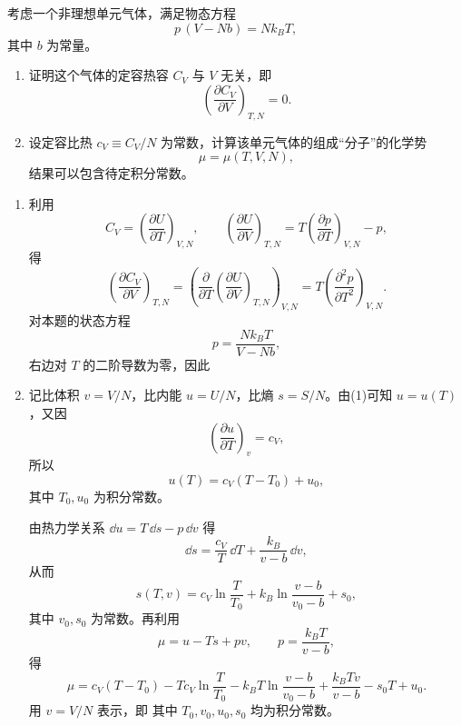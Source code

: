 ﻿


\begin{question}
考虑一个非理想单元气体，满足物态方程
\[
p\,(V-Nb)=Nk_B T,
\]
其中 $b$ 为常量。

\begin{enumerate}[label=(\arabic*),leftmargin=2.5em]
  \item 证明这个气体的定容热容 $C_V$ 与 $V$ 无关，即
  \[
  \left(\frac{\partial C_V}{\partial V}\right)_{T,N}=0.
  \]
  \item 设定容比热 $c_V\equiv C_V/N$ 为常数，计算该单元气体的组成“分子”的化学势
  \[
  \mu=\mu(T,V,N),
  \]
  结果可以包含待定积分常数。
\end{enumerate}

\begin{solution}
\begin{enumerate}[label=(\arabic*),leftmargin=2.5em]
  \item 利用
  \[
  C_V=\left(\frac{\partial U}{\partial T}\right)_{V,N},
  \qquad
  \left(\frac{\partial U}{\partial V}\right)_{T,N}
  =T\left(\frac{\partial p}{\partial T}\right)_{V,N}-p,
  \]
  得
  \[
  \left(\frac{\partial C_V}{\partial V}\right)_{T,N}
  =\left(\frac{\partial}{\partial T}\left(\frac{\partial U}{\partial V}\right)_{T,N}\right)_{V,N}
  =T\left(\frac{\partial^2 p}{\partial T^2}\right)_{V,N}.
  \]
  对本题的状态方程
  \[
  p=\frac{Nk_B T}{V-Nb},
  \]
  右边对 $T$ 的二阶导数为零，因此

  \item 记比体积 $v=V/N$，比内能 $u=U/N$，比熵 $s=S/N$。由(1)可知 $u=u(T)$，又因
  \[
  \left(\frac{\partial u}{\partial T}\right)_v=c_V,
  \]
  所以
  \[
  u(T)=c_V(T-T_0)+u_0,
  \]
  其中 $T_0,u_0$ 为积分常数。

  由热力学关系 $\dd{u}=T\,\dd{s}-p\,\dd{v}$ 得
  \[
  \dd{s}=\frac{c_V}{T}\,\dd{T}+\frac{k_B}{v-b}\,\dd{v},
  \]
  从而
  \[
  s(T,v)=c_V\ln\frac{T}{T_0}+k_B\ln\frac{v-b}{v_0-b}+s_0,
  \]
  其中 $v_0,s_0$ 为常数。再利用
  \[
  \mu=u-Ts+pv,
  \qquad p=\frac{k_B T}{v-b},
  \]
  得
  \[
  \mu=c_V(T-T_0)-Tc_V\ln\frac{T}{T_0}-k_B T\ln\frac{v-b}{v_0-b}
  +\frac{k_BTv}{v-b}-s_0T+u_0.
  \]
  用 $v=V/N$ 表示，即
  其中 $T_0,v_0,u_0,s_0$ 均为积分常数。
\end{enumerate}
\end{solution}
\end{question}

